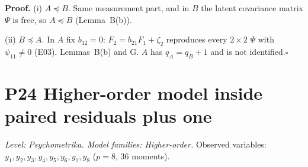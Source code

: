 \documentclass[10pt,a4paper]{article}
\newcommand{\nest}{\preceq}
\begin{document}
\noindent\textbf{Proof.} (i) $A\nest B$. Same measurement part, and in $B$ the latent covariance matrix $\Psi$ is free, so $A\nest B$ (Lemma~B(b)).\par\smallskip
\noindent(ii) $B\nest A$. In $A$ fix $b_{12}=0$: $F_2=b_{21}F_1+\zeta_2$ reproduces every $2\times2$ $\Psi$ with $\psi_{11}\neq0$ (E03). Lemmas~B(b) and G. $A$ has $q_A=q_B+1$ and is not identified.\hfill$\square$\par\medskip
{}

\clearpage
\section*{P24 \quad Higher-order model inside paired residuals plus one}
\noindent\textit{Level: Psychometrika. Model families: Higher-order.} Observed variables: $y_{1}, y_{2}, y_{3}, y_{4}, y_{5}, y_{6}, y_{7}, y_{8}$ ($p=8$, 36 moments).\par\medskip
\end{document}
